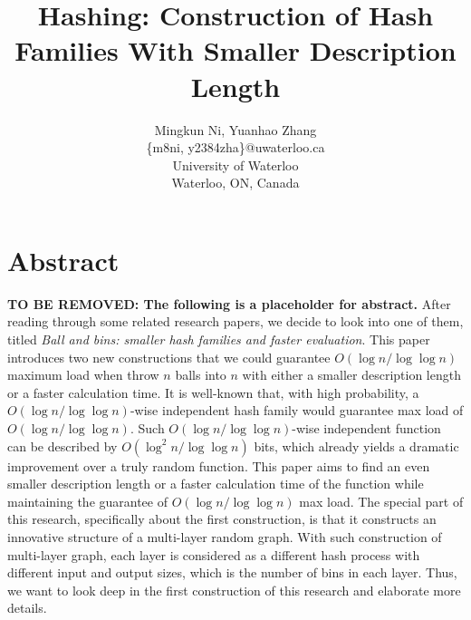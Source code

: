 \documentclass[letterpaper]{article} %
\begin{document}
\linespread{1.5}
	\title{Hashing: Construction of Hash Families With Smaller Description Length}
	\author{Mingkun Ni, Yuanhao Zhang\\
		\{m8ni, y2384zha\}@uwaterloo.ca\\
		University of Waterloo\\
		Waterloo, ON, Canada\\
	}
	\maketitle
		
	\section{Abstract}
	\textbf{TO BE REMOVED: The following is a placeholder for abstract.}
		\quad After reading through some related research papers, we decide to look into one of them, titled \textit{Ball and bins: smaller hash families and faster evaluation}. This paper introduces two new constructions that we could guarantee $O(\log n/\log\log n)$ maximum load when throw $n$ balls into $n$ with either a smaller description length or a faster calculation time. It is well-known that, with high probability, a $O(\log n/\log\log n)$-wise independent hash family would guarantee max load of $O(\log n/\log\log n)$. Such $O(\log n/\log\log n)$-wise independent function can be described by $O(\log^2 n/\log\log n)$ bits, which already yields a dramatic improvement over a truly random function. This paper aims to find an even smaller description length or a faster calculation time of the function while maintaining the guarantee of $O(\log n/\log\log n)$ max load. The special part of this research, specifically about the first construction, is that it constructs an innovative structure of a multi-layer random graph. With such construction of multi-layer graph, each layer is considered as a different hash process with different input and output sizes, which is the number of bins in each layer. Thus, we want to look deep in the first construction of this research and elaborate more details.
	
	\newpage
\end{document}
